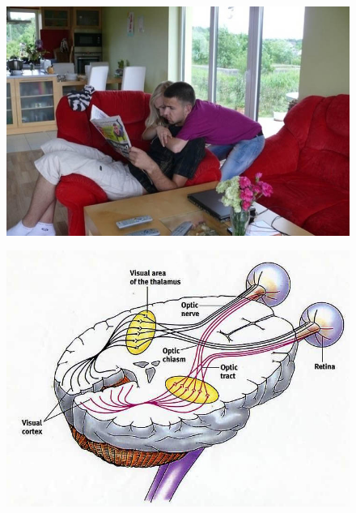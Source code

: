 \documentclass[10pt]{beamer}
\begin{document}

\begin{frame}{}
    \begin{figure}
        \centering
        \includegraphics[width=1.0\linewidth]{./img/confusing_image_4.jpg}
    \end{figure}
\end{frame}

\begin{frame}{}
    \begin{figure}
        \centering
        \includegraphics[width=0.9\linewidth]{./img/visual_system_brain.jpg}
    \end{figure}
\end{frame}
\end{document}
